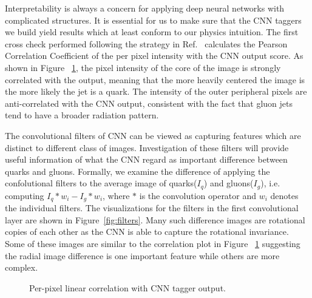 Interpretability is always a concern for applying deep neural networks
with complicated structures. It is essential for us to make sure that the
CNN taggers we build yield results which at least conform to our physics intuition.
The first cross check performed following the strategy in Ref.~\cite{deOliveira:2015xxd} calculates
the Pearson Correlation Coefficient of the per pixel intensity with the CNN output score.
As shown in Figure ~\ref{fig:correlation}, the pixel intensity of the core of the image is strongly
 correlated with the output, meaning that the more heavily centered the image is the more likely
the jet is a quark. The intensity of the outer peripheral pixels are anti-correlated with
the CNN output, consistent with the fact that gluon jets tend to have a broader radiation pattern. 

The convolutional filters of CNN can be viewed as capturing features which are distinct to different
class of images. Investigation of these filters will provide useful information of what the CNN regard as
important difference between quarks and gluons. Formally, we examine the difference of applying the
confolutional filters to the average image of quarks($I_q$) and gluons($I_g$), i.e. computing $I_q * w_i - I_g * w_i$,
where $*$ is the convolution operator and $w_i$ denotes the individual filters. The visualizations for the
filters in the first convolutional layer are shown in Figure~\ref{fig:filters}.
Many such difference images are rotational copies of each other as the CNN is able to capture the rotational
invariance. Some of these images are similar to the correlation plot in Figure ~\ref{fig:correlation} suggesting
the radial image difference is one important feature while others are more complex. 

\begin{figure}[htbp]
\begin{center}
\caption{
Per-pixel linear correlation with CNN tagger output.
}
\label{fig:correlation}
\end{center}
\end{figure}

